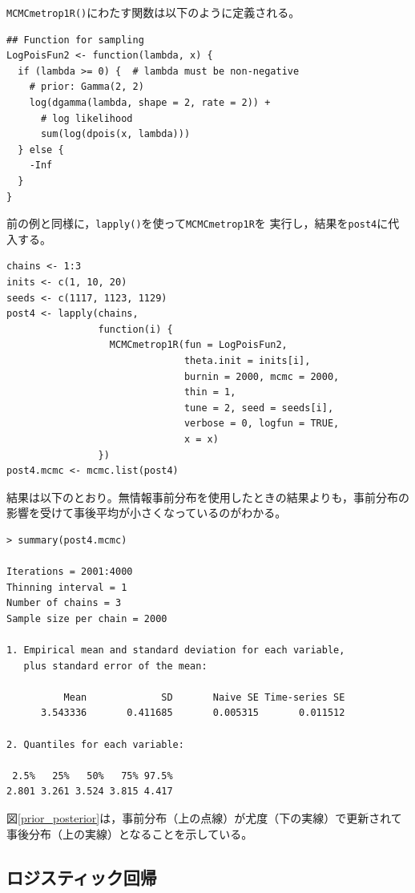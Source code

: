 \documentclass[11pt,uplatex]{jsarticle}
\begin{document}
\texttt{MCMCmetrop1R()}にわたす関数は以下のように定義される。
%
\begin{lstlisting}
## Function for sampling
LogPoisFun2 <- function(lambda, x) {
  if (lambda >= 0) {  # lambda must be non-negative
    # prior: Gamma(2, 2)
    log(dgamma(lambda, shape = 2, rate = 2)) + 
      # log likelihood
      sum(log(dpois(x, lambda)))
  } else {
    -Inf
  }
}
\end{lstlisting}

前の例と同様に，\texttt{lapply()}を使って\texttt{MCMCmetrop1R}を
実行し，結果を\texttt{post4}に代入する。
%
\begin{lstlisting}
chains <- 1:3
inits <- c(1, 10, 20)
seeds <- c(1117, 1123, 1129)
post4 <- lapply(chains,
                function(i) {
                  MCMCmetrop1R(fun = LogPoisFun2,
                               theta.init = inits[i],
                               burnin = 2000, mcmc = 2000,
                               thin = 1,
                               tune = 2, seed = seeds[i],
                               verbose = 0, logfun = TRUE,
                               x = x)
                })
post4.mcmc <- mcmc.list(post4)
\end{lstlisting}

結果は以下のとおり。無情報事前分布を使用したときの結果よりも，事前分布の
影響を受けて事後平均が小さくなっているのがわかる。

\begin{lstlisting}
> summary(post4.mcmc)

Iterations = 2001:4000
Thinning interval = 1 
Number of chains = 3 
Sample size per chain = 2000 

1. Empirical mean and standard deviation for each variable,
   plus standard error of the mean:

          Mean             SD       Naive SE Time-series SE 
      3.543336       0.411685       0.005315       0.011512 

2. Quantiles for each variable:

 2.5%   25%   50%   75% 97.5% 
2.801 3.261 3.524 3.815 4.417 

\end{lstlisting}

図\ref{prior_posterior}は，事前分布（上の点線）が尤度（下の実線）で更新されて
事後分布（上の実線）となることを示している。



\subsection{ロジスティック回帰}
\label{logistic}
\end{document}
